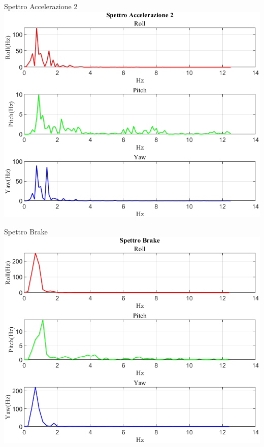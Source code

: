 \documentclass[beamer]{standalone}
\begin{document}
	\begin{frame}{{Spettro Accelerazione 2}}
		\centering\includegraphics[height=.8\textheight]{figure/VAng/Trasformata/Spettro Accelerazione 2}
	\end{frame}
	
	\begin{frame}{{Spettro Brake}}
		\centering\includegraphics[height=.8\textheight]{figure/VAng/Trasformata/Spettro Brake}
	\end{frame}
	
\end{document}
